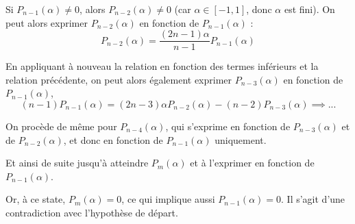 \documentclass[10pt,a4paper]{article}
\begin{document}
Si $P_{n-1}(\alpha) \neq 0$, alors $P_{n-2}(\alpha) \neq 0$ (car $\alpha \in [-1,1]$, donc $\alpha$
est fini). On peut alors exprimer $P_{n-2}(\alpha) $ en fonction de $P_{n-1}(\alpha)$ :
$$ P_{n-2}(\alpha) = \frac{(2n-1)\alpha}{n-1} P_{n-1}(\alpha)$$

En appliquant à nouveau la relation en fonction des termes inférieurs et la relation précédente, on
peut alors également exprimer $P_{n-3}(\alpha) $ en fonction de $P_{n-1}(\alpha)$,
$$ (n-1) P_{n-1}(\alpha) = (2n-3)\alpha P_{n-2}(\alpha) - (n-2)P_{n-3}(\alpha) \implies ... $$

On procède de même pour $P_{n-4}(\alpha)$, qui s'exprime en fonction de $P_{n-3}(\alpha)$ et
de $P_{n-2}(\alpha)$, et donc en fonction de $P_{n-1}(\alpha)$ uniquement.

Et ainsi de suite jusqu'à atteindre $P_m(\alpha)$ et à l'exprimer en fonction de $P_{n-1}(\alpha)$.

Or, à ce state, $P_m(\alpha) = 0$, ce qui implique aussi $P_{n-1}(\alpha) = 0$. Il s'agit d'une
contradiction avec l'hypothèse de départ.
\end{document}
